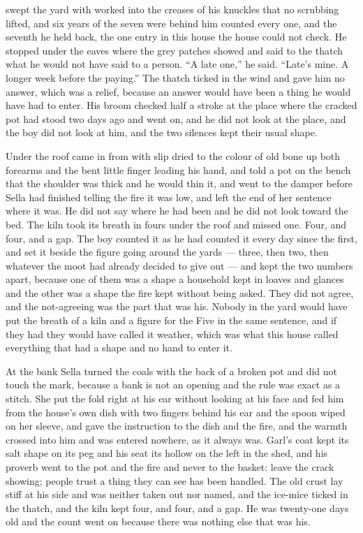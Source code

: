  swept the yard with  worked into the creases of his knuckles that no scrubbing lifted, and six years of the seven were behind him counted every one, and the seventh he held back, the one entry in this house the house could not check. He stopped under the eaves where the grey patches showed and said to the thatch what he would not have said to a person. “A late one,” he said. “Late's mine. A longer week before the paying.” The thatch ticked in the wind and gave him no answer, which was a relief, because an answer would have been a thing he would have had to enter. His broom checked half a stroke at the place where the cracked pot had stood two days ago and went on, and he did not look at the place, and the boy did not look at him, and the two silences kept their usual shape.

Under the roof  came in from  with slip dried to the colour of old bone up both forearms and the bent little finger leading his hand, and told a pot on the bench that the shoulder was thick and he would thin it, and went to the damper before Sella had finished telling the fire it was low, and left the end of her sentence where it was. He did not say where he had been and he did not look toward the bed. The kiln took its breath in fours under the roof and missed one. Four, and four, and a gap. The boy counted it as he had counted it every day since the first, and set it beside the figure going around the yards --- three, then two, then whatever the moot had already decided to give out --- and kept the two numbers apart, because one of them was a shape a household kept in loaves and glances and the other was a shape the fire kept without being asked. They did not agree, and the not-agreeing was the part that was his. Nobody in the yard would have put the breath of a kiln and a figure for the Five in the same sentence, and if they had they would have called it weather, which was what this house called everything that had a shape and no hand to enter it.

At the bank Sella turned the coals with the back of a broken pot and did not touch the mark, because a bank is not an opening and the rule was exact as a stitch. She put the fold right at his ear without looking at his face and fed him from the house's own dish with two fingers behind his ear and the spoon wiped on her sleeve, and gave the instruction to the dish and the fire, and the warmth crossed into him and was entered nowhere, as it always was. Garl's coat kept its salt shape on its peg and his seat its hollow on the left in the shed, and his proverb went to the pot and the fire and never to the basket: leave the crack showing; people trust a thing they can see has been handled. The old crust lay stiff at his side and was neither taken out nor named, and the ice-mice ticked in the thatch, and the kiln kept four, and four, and a gap. He was twenty-one days old and the count went on because there was nothing else that was his.

